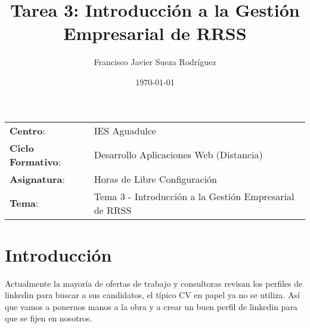


\title{
\vspace{10ex}
\normalfont \normalsize
\huge \textbf{Tarea 3: Introducción a la Gestión Empresarial de RRSS}
}
\author{Francisco Javier Sueza Rodríguez}
\date{\normalsize\today}



\maketitle

\thispagestyle{empty}

\vspace{65ex}

\begin{center}
    \begin{tabular}{l l}
        \textbf{Centro}: & IES Aguadulce \\
        \textbf{Ciclo Formativo}: & Desarrollo Aplicaciones Web (Distancia)\\
        \textbf{Asignatura}: & Horas de Libre Configuración\\
        \textbf{Tema}: & Tema 3 - Introducción a la Gestión Empresarial de RRSS\\
    \end{tabular}
\end{center}

\newpage

\tableofcontents

\vspace{30ex}

\listoffigures

\newpage

\section{Introducción}
Actualmente la mayoría de ofertas de trabajo y consultoras revisan los perfiles de linkedin para buscar a sus candidatos, el típico CV en papel ya no se utiliza. Así que vamos a ponernos manos a la obra y a crear un buen perfil de linkedin para que se fijen en nosotros.

